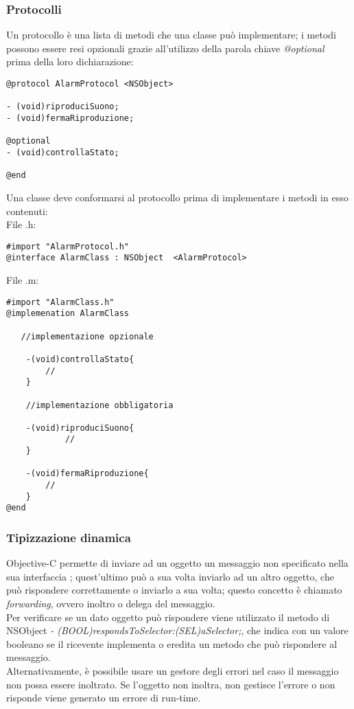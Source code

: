 \subsubsection{Protocolli}
Un protocollo è una lista di metodi che una classe può implementare; i metodi possono essere resi opzionali grazie all'utilizzo della parola chiave \textit{@optional} prima della loro dichiarazione: 
\lstset{language=[Objective]C, breakindent=40pt, breaklines}
\begin{lstlisting}
@protocol AlarmProtocol <NSObject>

- (void)riproduciSuono;
- (void)fermaRiproduzione;

@optional
- (void)controllaStato;

@end
\end{lstlisting}
\newpage
Una classe deve conformarsi al protocollo prima di implementare i metodi in esso contenuti:\\
File .h: 
\lstset{language=[Objective]C, breakindent=40pt, breaklines}
\begin{lstlisting}
#import "AlarmProtocol.h"
@interface AlarmClass : NSObject  <AlarmProtocol>
\end{lstlisting}
File .m:
\lstset{language=[Objective]C, breakindent=40pt, breaklines}
\begin{lstlisting}
#import "AlarmClass.h"
@implemenation AlarmClass
  
   //implementazione opzionale 
    
    -(void)controllaStato{
		//
    }

    //implementazione obbligatoria  
   
    -(void)riproduciSuono{
    	    // 
    }
    
    -(void)fermaRiproduzione{
   	 	//
    }
@end
\end{lstlisting}
\subsubsection{Tipizzazione dinamica}
Objective-C permette di inviare ad un oggetto un messaggio non specificato nella sua interfaccia ; quest'ultimo può a sua volta inviarlo ad un altro oggetto, che può rispondere correttamente o inviarlo a sua volta; questo concetto è chiamato \textit{forwarding}, ovvero inoltro o delega del messaggio.\\Per verificare se un dato oggetto può rispondere viene utilizzato il metodo di NSObject \textit{- (BOOL)respondsToSelector:(SEL)aSelector;}, che indica con un valore booleano se il ricevente implementa o eredita un metodo che può rispondere al messaggio.\\Alternativamente, è possibile usare un gestore degli errori nel caso il messaggio non possa essere inoltrato. Se l'oggetto non inoltra, non gestisce l'errore o non risponde viene generato un errore di run-time. 
